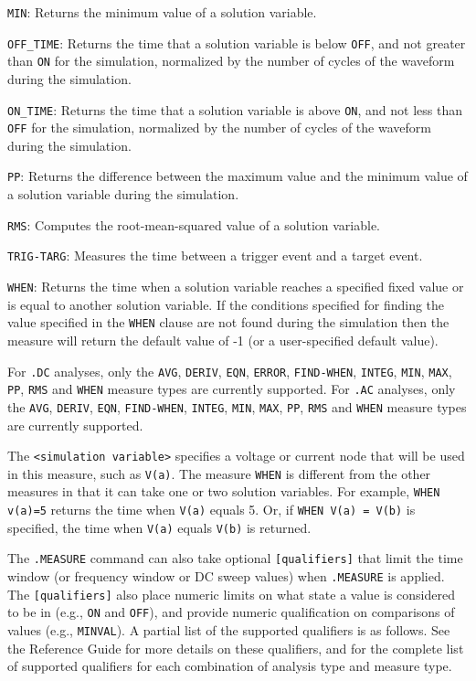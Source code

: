 \begin{XyceItemize}
  \item \texttt{MIN}: Returns the minimum value of a solution variable.
  \item \texttt{OFF\_TIME}: Returns the time that a solution variable is below \texttt{OFF}, and not
    greater than \texttt{ON} for the simulation, normalized by the number of cycles
of the waveform during the simulation.
  \item \texttt{ON\_TIME}: Returns the time that a solution variable is above \texttt{ON}, and not
    less than \texttt{OFF} for the simulation, normalized by the number of cycles
of the waveform during the simulation.
  \item \texttt{PP}: Returns the difference between the maximum value and the minimum value of
    a solution variable during the simulation.
  \item \texttt{RMS}: Computes the root-mean-squared value of a solution variable.
  \item \texttt{TRIG-TARG}: Measures the time between a trigger event and a target event.
  \item \texttt{WHEN}: Returns the time when a solution variable reaches a specified fixed 
    value or is equal to another solution variable.  If the conditions specified for
    finding the value specified in the \texttt{WHEN} clause are not found during the simulation 
    then the measure will return the default value of -1 (or a user-specified default value).
\end{XyceItemize}

For \texttt{.DC} analyses, only the \texttt{AVG}, \texttt{DERIV}, \texttt{EQN}, \texttt{ERROR},
\texttt{FIND-WHEN}, \texttt{INTEG}, \texttt{MIN}, \texttt{MAX}, \texttt{PP}, \texttt{RMS} and
\texttt{WHEN} measure types are currently supported.  For \texttt{.AC} analyses, only the
\texttt{AVG}, \texttt{DERIV}, \texttt{EQN}, \texttt{FIND-WHEN}, \texttt{INTEG}, \texttt{MIN},
\texttt{MAX}, \texttt{PP}, \texttt{RMS} and \texttt{WHEN} measure types are currently supported.

The \texttt{<simulation variable>} specifies a voltage or current node that
will be used in this measure, such as \texttt{V(a)}.  The measure \texttt{WHEN}
is different from the other measures in that it can take one or two solution
variables. For example, \texttt{WHEN v(a)=5} returns the time when
\texttt{V(a)} equals 5.  Or, if \texttt{WHEN V(a) = V(b)} is specified, the
time when \texttt{V(a)} equals \texttt{V(b)} is returned.

The \texttt{.MEASURE} command can also take optional \texttt{[qualifiers]} that
limit the time window (or frequency window or DC sweep values) when \texttt{.MEASURE} is 
applied. The \texttt{[qualifiers]} also place numeric limits on what state a value is
considered to be in (e.g., \texttt{ON} and \texttt{OFF}), and provide numeric
qualification on comparisons of values (e.g., \texttt{MINVAL}).  A partial list of the supported
qualifiers is as follows.  See the \Xyce{} Reference Guide\ReferenceGuide{} for more details
on these qualifiers, and for the complete list of supported qualifiers for each combination
of analysis type and measure type.

